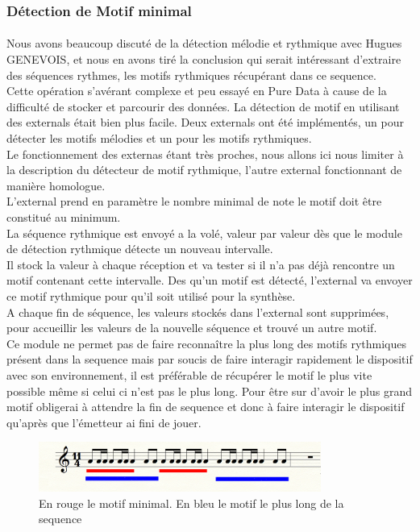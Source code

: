 \documentclass[a4paper, titlepage, oneside, 12pt]{article}%
\begin{document}
\subsubsection{Détection de Motif minimal}
\paragraph{}
Nous avons beaucoup discuté de la détection mélodie et rythmique avec Hugues GENEVOIS, et nous en avons tiré la conclusion qui serait intéressant d'extraire des séquences rythmes, les motifs rythmiques récupérant dans ce sequence.\\
Cette opération s’avérant complexe et peu essayé en Pure Data à cause de la difficulté de stocker et parcourir des données. La détection de motif en utilisant des externals était bien plus facile. Deux externals ont été implémentés, un pour détecter les motifs mélodies et un pour les motifs rythmiques.\\
Le fonctionnement des externas étant très proches, nous allons ici nous limiter à la description du détecteur de motif rythmique, l'autre external fonctionnant de manière homologue.\\
L'external prend en paramètre le nombre minimal de note le motif doit être constitué au minimum.\\
La séquence rythmique est envoyé a la volé, valeur par valeur dès que le module de détection rythmique détecte un nouveau intervalle.\\
Il stock la valeur à chaque réception et va tester si il n'a pas déjà rencontre un motif contenant cette intervalle. Des qu'un motif est détecté, l'external va envoyer ce motif rythmique pour qu'il soit utilisé pour la synthèse.\\
A chaque fin de séquence, les valeurs stockés dans l'external sont supprimées, pour accueillir les valeurs de la nouvelle séquence et trouvé un autre motif.\\
Ce module ne permet pas de faire reconnaître la plus long des motifs rythmiques présent dans la sequence mais par soucis  de faire interagir rapidement le dispositif avec son environnement, il est préférable de récupérer le motif le plus vite possible même si celui ci n'est pas le plus long. Pour être sur d'avoir le plus grand motif obligerai à attendre la fin de sequence et donc à faire interagir le dispositif qu'après que l'émetteur ai fini de jouer.
\begin{figure}[H]
	\centering
	\includegraphics[width=350px]{motifrythme.jpg}
	\caption{En rouge le motif minimal. En bleu le motif le plus long de la sequence}
\end{figure}
\end{document}
